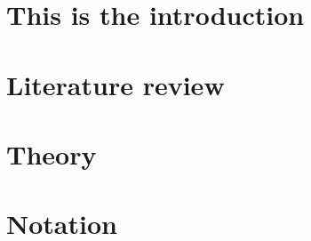 \documentclass[11pt,                                          %
               a4paper,                                       %
               openright,                                     %
               twoside]{report}                               %
\begin{document}
\pagestyle{fancy}                                             %
\chapter[Introduction]{This is the introduction}              %
\label{chap:intro}                                            %

\chapter[Literature review]{Literature review}                %
\label{chap:litreview}                                        %

\chapter{Theory}                                              %
\label{chap:theory}                                           %

\chapter*{Notation}                                           %
\label{chap:notation}                                         %
\end{document}

